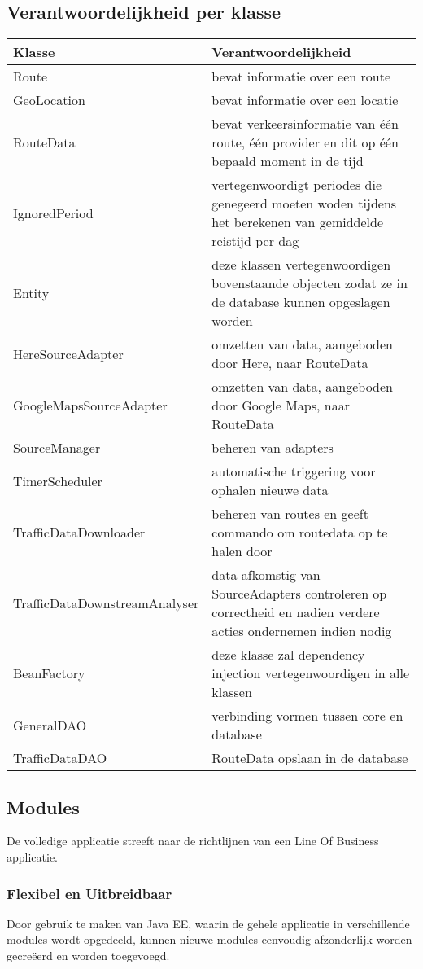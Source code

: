 \documentclass[ps,a4paper,oneside]{report}
\begin{document}
\subsection{Verantwoordelijkheid per klasse}
\begin{tabular}{ | l | p{6.5cm}| }
	\hline
	\textbf{Klasse} & \textbf{Verantwoordelijkheid} \\
	\hline
	Route & bevat informatie over een route \\
	\hline
	GeoLocation & bevat informatie over een locatie \\
	\hline
	RouteData & bevat verkeersinformatie van \'e\'en route, \'e\'en provider en dit op \'e\'en bepaald moment in de tijd \\
	\hline
	IgnoredPeriod & vertegenwoordigt periodes die genegeerd moeten woden tijdens het berekenen van gemiddelde reistijd per dag\\
	\hline
	[Object]Entity & deze klassen vertegenwoordigen bovenstaande objecten zodat ze in de database kunnen opgeslagen worden\\
	\hline
	HereSourceAdapter & omzetten van data, aangeboden door Here, naar RouteData\\	
	\hline
	GoogleMapsSourceAdapter & omzetten van data, aangeboden door Google Maps, naar RouteData\\	
	\hline
	SourceManager & beheren van adapters\\	
	\hline
	TimerScheduler & automatische triggering voor ophalen nieuwe data\\	
	\hline
	TrafficDataDownloader & beheren van routes en geeft commando om routedata op te halen door\\	
	\hline
	TrafficDataDownstreamAnalyser & data afkomstig van SourceAdapters controleren op correctheid en nadien verdere acties ondernemen indien nodig\\		
	\hline
	BeanFactory & deze klasse zal dependency injection vertegenwoordigen in alle klassen \\	
	\hline
	GeneralDAO & verbinding vormen tussen core en database\\	
	\hline
	TrafficDataDAO & RouteData opslaan in de database\\	
	\hline
\end{tabular}
\subsection{Modules}
De volledige applicatie streeft naar de richtlijnen van een Line Of Business applicatie. 
\subsubsection{Flexibel en Uitbreidbaar}
Door gebruik te maken van Java EE, waarin de gehele applicatie in verschillende modules wordt opgedeeld, kunnen nieuwe modules eenvoudig afzonderlijk worden gecreëerd en worden toegevoegd. 
\end{document}
